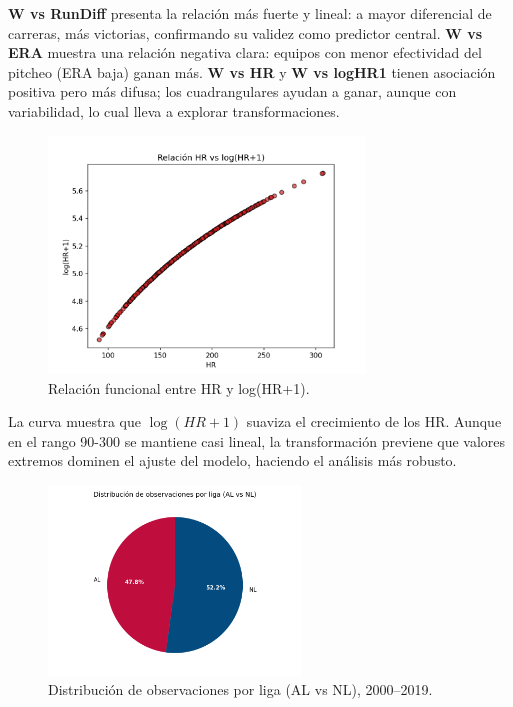 \documentclass[10pt]{article}
\begin{document}
\textbf{W vs RunDiff} presenta la relación más fuerte y lineal: a mayor diferencial de carreras, más victorias, confirmando su validez como predictor central.  
\textbf{W vs ERA} muestra una relación negativa clara: equipos con menor efectividad del pitcheo (ERA baja) ganan más.  
\textbf{W vs HR} y \textbf{W vs logHR1} tienen asociación positiva pero más difusa; los cuadrangulares ayudan a ganar, aunque con variabilidad, lo cual lleva a explorar transformaciones.

\begin{figure}[H]
    \centering
    \includegraphics[width=0.75\textwidth]{../plots/scatter_HR_logHR1.png}
    \caption{Relación funcional entre HR y log(HR+1).}
\end{figure}

La curva muestra que $\log(HR+1)$ suaviza el crecimiento de los HR. 
Aunque en el rango 90-300 se mantiene casi lineal, la transformación previene que valores extremos dominen el ajuste del modelo, haciendo el análisis más robusto.

\begin{figure}[H]
    \centering
    \includegraphics[width=0.6\textwidth]{../plots/pie_ligas_colored.png}
    \caption{Distribución de observaciones por liga (AL vs NL), 2000--2019.}
\end{figure}
\end{document}
